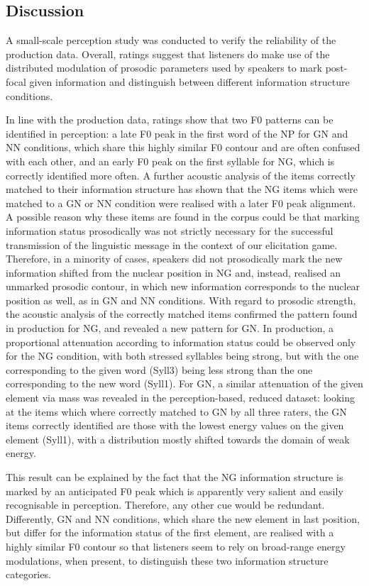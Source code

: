 \subsection{Discussion}
\label{sec:2.4.4}
A small-scale perception study was conducted to verify the reliability of the production data. Overall, ratings suggest that listeners do make use of the distributed modulation of prosodic parameters used by speakers to mark post-focal given information and distinguish between different information structure conditions.

In line with the production data, ratings show that two F0 patterns can be identified in perception: a late F0 peak in the first word of the NP for GN and NN conditions, which share this highly similar F0 contour and are often confused with each other, and an early F0 peak on the first syllable for NG, which is correctly identified more often. A further acoustic analysis of the items correctly matched to their information structure has shown that the NG items which were matched to a GN or NN condition were realised with a later F0 peak alignment. A possible reason why these items are found in the corpus could be that marking information status prosodically was not strictly necessary for the successful transmission of the linguistic message in the context of our elicitation game. Therefore, in a minority of cases, speakers did not prosodically mark the new information shifted from the nuclear position in NG and, instead, realised an unmarked prosodic contour, in which new information corresponds to the nuclear position as well, as in GN and NN conditions. With regard to prosodic strength, the acoustic analysis of the correctly matched items confirmed the pattern found in production for NG, and revealed a new pattern for GN. In production, a proportional attenuation according to information status could be observed only for the NG condition, with both stressed syllables being strong, but with the one corresponding to the given word (Syll3) being less strong than the one corresponding to the new word (Syll1). For GN, a similar attenuation of the given element via mass was revealed in the perception-based, reduced dataset: looking at the items which where correctly matched to GN by all three raters, the GN items correctly identified are those with the lowest energy values on the given element (Syll1), with a distribution mostly shifted towards the domain of weak energy.

This result can be explained by the fact that the NG information structure is marked by an anticipated F0 peak which is apparently very salient and easily recognisable in perception. Therefore, any other cue would be redundant. Differently, GN and NN conditions, which share the new element in last position, but differ for the information status of the first element, are realised with a highly similar F0 contour so that listeners seem to rely on broad-range energy modulations, when present, to distinguish these two information structure categories.

